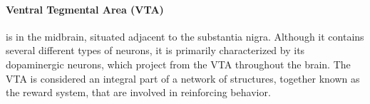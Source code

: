 \documentclass[../structure.tex]{subfiles}
\begin{document}
		\paragraph{Ventral Tegmental Area (VTA)}
		is in the midbrain, situated adjacent to the substantia nigra. Although it contains several different types of neurons, it is primarily characterized by its dopaminergic neurons, which project from the VTA throughout the brain.
		The VTA is considered an integral part of a network of structures, together known as the reward system, that are involved in reinforcing behavior.
\end{document}
